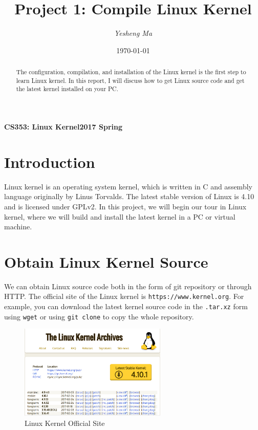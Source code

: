 \documentclass{article}
\begin{document}
\title{Project 1: Compile Linux Kernel}
\author{\textit{Yesheng Ma}}
\date{\today}
{\bf\small CS353: Linux Kernel}\hfill{\bf\small 2017 Spring}
{\let\newpage\relax\maketitle}
\maketitle


\begin{abstract} 
The configuration, compilation, and installation of the Linux kernel is the first step to learn Linux kernel. In this report, I will discuss how to get Linux source code and get the latest kernel installed on your PC.
\end{abstract}


\section{Introduction}
Linux kernel is an operating system kernel, which is written in C and assembly language originally by Linus Torvalds. The latest stable version of Linux is 4.10 and is licensed under GPLv2. In this project, we will begin our tour in Linux kernel, where we will build and install the latest kernel in a PC or virtual machine.

\section{Obtain Linux Kernel Source}
We can obtain Linux source code both in the form of git repository or through HTTP. The official site of the Linux kernel is \texttt{https://www.kernel.org}. For example, you can download the latest kernel source code in the \texttt{.tar.xz} form using \texttt{wget} or using \texttt{git clone} to copy the whole repository.

\begin{figure}[H]
\centering
\includegraphics[width=7cm]{website.png}
\caption{Linux Kernel Official Site}
\end{figure}
  
\end{document}
